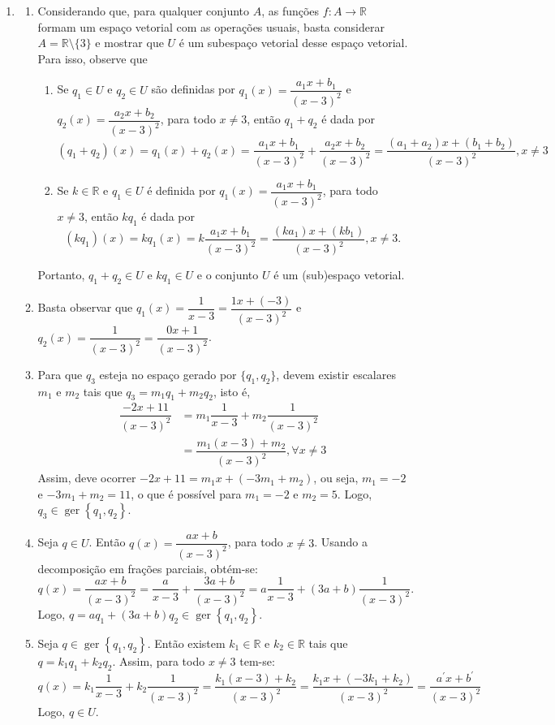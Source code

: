 \documentclass[12pt,a4paper]{article}
\newcommand*\ger[1]{\operatorname{ger}\left\{#1\right\}}
\newcommand*\R{\mathbb{R}}
\begin{document}
\begin{enumerate}
\item
\begin{enumerate}
\item Considerando que, para qualquer conjunto $A$, as funções $f:A \to \R$ formam um espaço vetorial com as operações usuais, basta considerar $A = \R \setminus \{3\}$ e mostrar que $U$ é um subespaço vetorial desse espaço vetorial. Para isso, observe que
\begin{enumerate}
\item Se $q_1 \in U$ e $q_2 \in U$ são definidas por $q_1(x) = \dfrac{a_1x+b_1}{(x-3)^2}$ e $q_2(x) = \dfrac{a_2x+b_2}{(x-3)^2}$, para todo $x\neq 3$, então $q_1+q_2$ é dada por
\[
(q_1+q_2)(x)
= q_1(x) + q_2(x)
= \dfrac{a_1x+b_1}{(x-3)^2}
 +\dfrac{a_2x+b_2}{(x-3)^2}
= \dfrac{(a_1+a_2)x+(b_1+b_2)}{(x-3)^2}, x\neq 3
\]
\item Se $k \in \R$ e $q_1 \in U$ é definida por $q_1(x) = \dfrac{a_1x+b_1}{(x-3)^2}$, para todo $x\neq 3$, então $k q_1$ é dada por
\[
(kq_1)(x)
= kq_1(x)
= k \dfrac{a_1x+b_1}{(x-3)^2}
= \dfrac{(ka_1)x+(kb_1)}{(x-3)^2}, x\neq 3.
\]
\end{enumerate}
Portanto, $q_1+q_2 \in U$ e $k q_1\in U$ e o conjunto $U$ é um (sub)espaço vetorial.
\item Basta observar que
$
q_1(x) = \dfrac{1}{x-3}
= \dfrac{1x+(-3)}{(x-3)^2}
$
e
$
q_2(x) = \dfrac{1}{(x-3)^2}
=\dfrac{0x+1}{(x-3)^2}
$.
\item Para que $q_3$ esteja no espaço gerado por $\{q_1, q_2\}$, devem existir escalares $m_1$ e $m_2$ tais que $q_3 = m_1 q_1 + m_2q_2$, isto é,
\begin{align*}
\dfrac{-2x+11}{(x-3)^2}
& = m_1 \dfrac{1}{x-3}
  + m_2 \dfrac{1}{(x-3)^2}\\
& = \dfrac{m_1(x-3)+m_2}{(x-3)^2},\forall x\neq3
\end{align*}
Assim, deve ocorrer $-2x+11 = m_1x + (-3m_1+m_2)$, ou seja, $m_1 = -2$ e $-3m_1+m_2=11$, o que é possível para $m_1 = -2$ e $m_2=5$. Logo, $q_3 \in \ger{q_1,q_2}$.

\item Seja $q \in U$. Então $q(x) = \dfrac{ax+b}{(x-3)^2}$, para todo $x \neq 3$. Usando a decomposição em frações parciais, obtém-se:
\[
q(x)
= \dfrac{ax+b}{(x-3)^2}
= \dfrac{a}{x-3}
+ \dfrac{3a+b}{(x-3)^2}
= a\dfrac{1}{x-3}
+ (3a+b)\dfrac{1}{(x-3)^2}.
\]
Logo, $q = aq_1+(3a+b)q_2 \in \ger{q_1, q_2}$.
\item Seja $q \in \ger{q_1, q_2}$. Então existem $k_1 \in \R$ e $k_2 \in \R$ tais que $q = k_1 q_1 + k_2q_2$. Assim, para todo $x \neq 3$ tem-se:
\[
q(x)
= k_1\dfrac{1}{x-3}
+ k_2\dfrac{1}{(x-3)^2}
= \dfrac{k_1(x-3) + k_2}{(x-3)^2}
= \dfrac{k_1x+(-3k_1+ k_2)}{(x-3)^2}
= \dfrac{a^\prime x+b^\prime}{(x-3)^2}
\]
Logo, $q \in U$.


\end{enumerate}
\end{enumerate}
\end{document}
